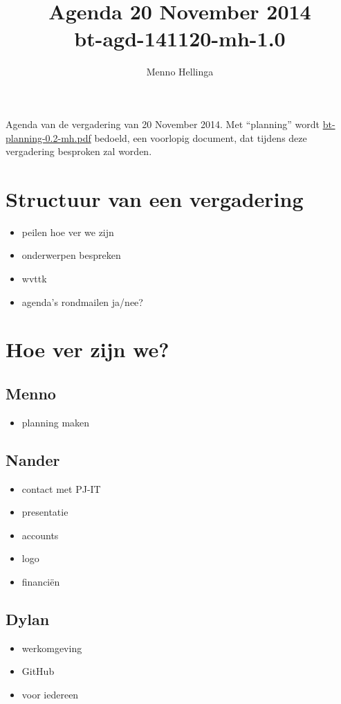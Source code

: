 \documentclass[a4paper, 10pt]{article}
\begin{document}
\frenchspacing
\title{Agenda 20 November 2014\\bt-agd-141120-mh-1.0}
\author{Menno Hellinga}
\date{\empty}

\maketitle

Agenda van de vergadering van 20 November 2014. Met ``planning'' wordt
\url{bt-planning-0.2-mh.pdf} bedoeld, een voorlopig document, dat tijdens deze
vergadering besproken zal worden.

\tableofcontents

\newpage
\section{Structuur van een vergadering}
\begin{itemize}
	\item peilen hoe ver we zijn
	\item onderwerpen bespreken
	\item wvttk
	\item agenda's rondmailen ja/nee?
\end{itemize}

\section{Hoe ver zijn we?}

\subsection{Menno}
\begin{itemize}
	\item planning maken
\end{itemize}

\subsection{Nander}
\begin{itemize}
	\item contact met PJ-IT
	\item presentatie
	\item accounts
	\item logo
	\item financi\"en
\end{itemize}

\subsection{Dylan}
\begin{itemize}
	\item werkomgeving
	\item GitHub
	\item voor iedereen
\end{itemize}
\end{document}
